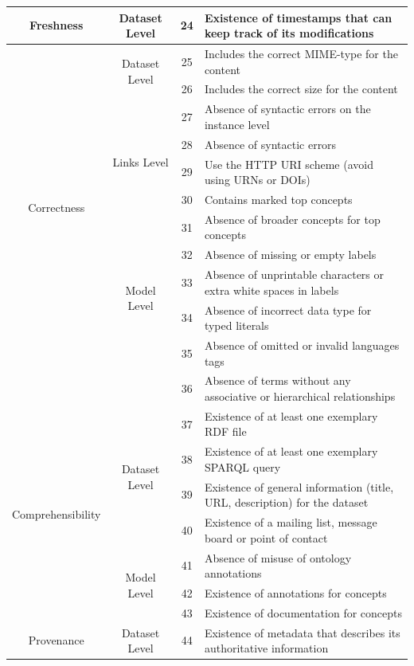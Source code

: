 \documentclass[onecolumn, crcready]{iosart2c}
\begin{document}
\begin{center}
{\begin{longtable}[h]{|c|c|c|l|}
\hline
\hline
\multirow{1}{*}{Freshness} & \multirow{1}{*}{Dataset Level} & 24 & Existence of timestamps that can keep track of its modifications  \cite{Flouris2012}\tabularnewline
\hline
\hline
\multirow{11}{*}{Correctness}  & \multirow{2}{*}{Dataset Level} & 25 & Includes the correct MIME-type for the content  \cite{Hogan2010}\tabularnewline
\cline{3-4}
 &  & 26 & Includes the correct size for the content \tabularnewline
 \cline{3-4}
 &  & 27 & Absence of syntactic errors on the instance level \cite{Hogan2010}\tabularnewline
\cline{2-4}
 & \multirow{2}{*}{Links Level} & 28 & Absence of syntactic errors  \cite{Suominen2013}\tabularnewline
 \cline{3-4}
 &  & 29 & Use the HTTP URI scheme (avoid using URNs or DOIs) \cite{Mader2012}\tabularnewline
\cline{2-4}
 & \multirow{7}{*}{Model Level} & 30 & Contains marked top concepts \cite{Mader2012}\tabularnewline
\cline{3-4}
 &  & 31 & Absence of broader concepts for top concepts \cite{Mader2012}\tabularnewline
 \cline{3-4}
 & & 32 & Absence of missing or empty labels \cite{Acosta2013}\cite{Mader2012}\tabularnewline
  \cline{3-4}
 & & 33 & Absence of unprintable characters \cite{Acosta2013}\cite{Mader2012} or extra white spaces in labels \cite{Suominen:2012:IQS:2413941.2413985}\tabularnewline
\cline{3-4}
 &  & 34 & Absence of incorrect data type for typed literals \cite{Hogan2010}\cite{Acosta2013} \tabularnewline
\cline{3-4}
 &  & 35 & Absence of omitted or invalid languages tags \cite{Suominen:2012:IQS:2413941.2413985}\cite{Mader2012}\tabularnewline
\cline{3-4}
 &  & 36 & Absence of terms without any associative or hierarchical relationships \cite{journals/ires/Living10}\tabularnewline
\hline
\hline
\multirow{7}{*}{Comprehensibility} & \multirow{4}{*}{Dataset Level} & 37 & Existence of at least one exemplary RDF file \cite{Framework2012}\tabularnewline
\cline{3-4}
 &  & 38 & Existence of at least one exemplary SPARQL query \cite{Framework2012}\tabularnewline
 \cline{3-4}
 &  & 39 &  Existence of general information (title, URL, description) for the dataset \tabularnewline
\cline{3-4}
 &  & 40 & Existence of a mailing list, message board or point of contact \cite{flemming2010}\tabularnewline
 \cline{2-4}
 & \multirow{3}{*}{Model Level} & 41 & Absence of misuse of ontology annotations \cite{Mader2012}\cite{DBLP:conf/ic3k/KeetSP13}\tabularnewline
  \cline{3-4}
 & & 42 & Existence of annotations for concepts \cite{DBLP:conf/ic3k/KeetSP13}\tabularnewline
 \cline{3-4}
 & & 43 & Existence of documentation for concepts \cite{Mader2012}\cite{DBLP:conf/ic3k/KeetSP13}\tabularnewline
\hline
\hline
\multirow{3}{*}{Provenance} & \multirow{2}{*}{Dataset Level} & 44 & Existence of metadata that describes its authoritative information  \cite{Flouris2012}\tabularnewline

\end{longtable}}
\end{center}
\end{document}

